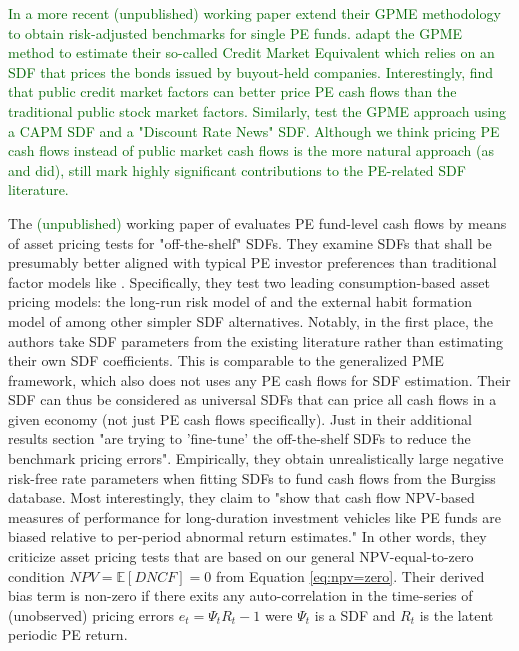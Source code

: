 \textcolor{darkgreen}{
	In a more recent (unpublished) working paper \cite{KN22} extend their GPME methodology to obtain risk-adjusted benchmarks for single PE funds.
	\cite{NSS22} adapt the GPME method to estimate their so-called Credit Market Equivalent which relies on an SDF that prices the bonds issued by buyout-held companies.
	Interestingly, \cite{NSS22} find that public credit market factors can better price PE cash flows than the traditional public stock market factors.
	Similarly, \cite{GJ21} test the GPME approach using a CAPM SDF and a "Discount Rate News" SDF.
	Although we think pricing PE cash flows instead of public market cash flows is the more natural approach (as \cite{GJ21} and \cite{NSS22} did), \cite{KN16,KN22} still mark highly significant contributions to the PE-related SDF literature.
}


The \textcolor{darkgreen}{(unpublished)} working paper of \cite{GSW19} evaluates PE fund-level cash flows by means of asset pricing tests for "off-the-shelf" SDFs.
They examine SDFs that shall be presumably better aligned with typical PE investor preferences than traditional factor models like \cite{FF15}.
Specifically, they test two leading consumption-based asset pricing models: the long-run risk model of \cite{BY04} and the external habit formation model of \cite{CC99} among other simpler SDF alternatives.
Notably, in the first place, the authors take SDF parameters from the existing literature rather than estimating their own SDF coefficients.
This is comparable to the \cite{KN16} generalized PME framework, which also does not uses any PE cash flows for SDF estimation.
Their SDF can thus be considered as universal SDFs that can price all cash flows in a given economy (not just PE cash flows specifically).
Just in their additional results section \cite{GSW19} "are trying to 'fine-tune' the off-the-shelf SDFs to reduce the benchmark pricing errors".
Empirically, they obtain unrealistically large negative risk-free rate parameters when fitting SDFs to fund cash flows from the Burgiss database.
Most interestingly, they claim to "show that cash flow NPV-based measures of performance for long-duration investment vehicles like PE funds are biased relative to per-period abnormal return estimates."
In other words, they criticize asset pricing tests that are based on our general NPV-equal-to-zero condition $NPV = \mathbb{E} \left[ DNCF \right] = 0$ from Equation \ref{eq:npv=zero}. 
Their derived bias term is non-zero if there exits any auto-correlation in the time-series of (unobserved) pricing errors $e_t = \Psi_t R_t - 1$ were $\Psi_t$ is a SDF and $R_t$ is the latent periodic PE return.
